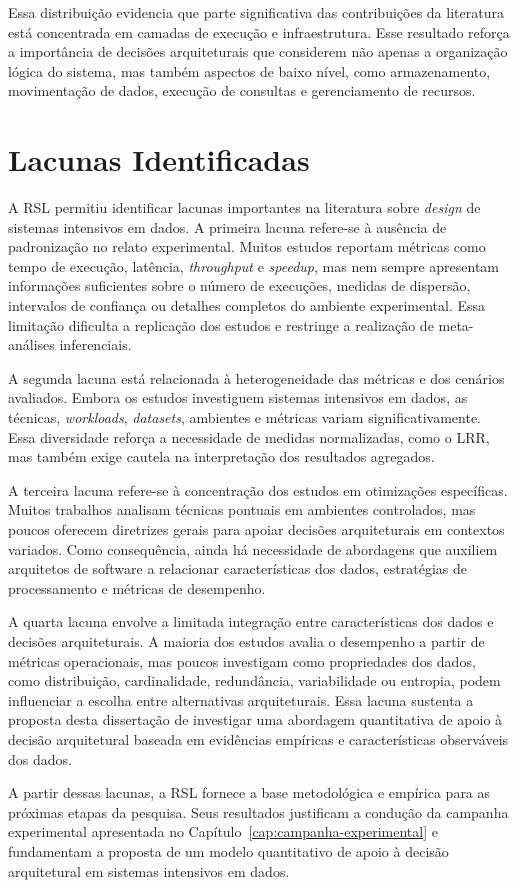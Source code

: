 Essa distribuição evidencia que parte significativa das contribuições da literatura está concentrada em camadas de execução e infraestrutura. Esse resultado reforça a importância de decisões arquiteturais que considerem não apenas a organização lógica do sistema, mas também aspectos de baixo nível, como armazenamento, movimentação de dados, execução de consultas e gerenciamento de recursos.

\section{Lacunas Identificadas}
\label{sec:rsl-lacunas}

A RSL permitiu identificar lacunas importantes na literatura sobre \textit{design} de sistemas intensivos em dados. A primeira lacuna refere-se à ausência de padronização no relato experimental. Muitos estudos reportam métricas como tempo de execução, latência, \textit{throughput} e \textit{speedup}, mas nem sempre apresentam informações suficientes sobre o número de execuções, medidas de dispersão, intervalos de confiança ou detalhes completos do ambiente experimental. Essa limitação dificulta a replicação dos estudos e restringe a realização de meta-análises inferenciais.

A segunda lacuna está relacionada à heterogeneidade das métricas e dos cenários avaliados. Embora os estudos investiguem sistemas intensivos em dados, as técnicas, \textit{workloads}, \textit{datasets}, ambientes e métricas variam significativamente. Essa diversidade reforça a necessidade de medidas normalizadas, como o LRR, mas também exige cautela na interpretação dos resultados agregados.

A terceira lacuna refere-se à concentração dos estudos em otimizações específicas. Muitos trabalhos analisam técnicas pontuais em ambientes controlados, mas poucos oferecem diretrizes gerais para apoiar decisões arquiteturais em contextos variados. Como consequência, ainda há necessidade de abordagens que auxiliem arquitetos de software a relacionar características dos dados, estratégias de processamento e métricas de desempenho.

A quarta lacuna envolve a limitada integração entre características dos dados e decisões arquiteturais. A maioria dos estudos avalia o desempenho a partir de métricas operacionais, mas poucos investigam como propriedades dos dados, como distribuição, cardinalidade, redundância, variabilidade ou entropia, podem influenciar a escolha entre alternativas arquiteturais. Essa lacuna sustenta a proposta desta dissertação de investigar uma abordagem quantitativa de apoio à decisão arquitetural baseada em evidências empíricas e características observáveis dos dados.

A partir dessas lacunas, a RSL fornece a base metodológica e empírica para as próximas etapas da pesquisa. Seus resultados justificam a condução da campanha experimental apresentada no Capítulo~\ref{cap:campanha-experimental} e fundamentam a proposta de um modelo quantitativo de apoio à decisão arquitetural em sistemas intensivos em dados.
